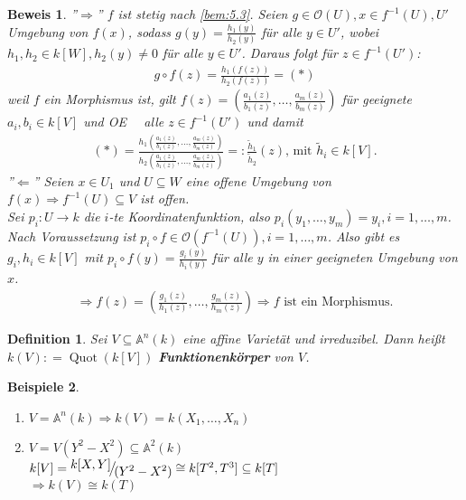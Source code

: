 \documentclass[a4paper,12pt]{report}
\theoremstyle{break}
\newtheorem{Def}{Definition}[section]
\newtheorem{Bsp}[Def]{Beispiele}
\theoremstyle{nonumberbreak}
\theoremstyle{nonumberplain}
\newtheorem{Bew}{Beweis}
\newcommand{\emp}[1]{\textbf{\emph{#1}}}
\newcommand{\begriff}[1]{{\index{#1}}\emp{#1}}
\newcommand{\defeqr}[0]{\mathrel{\mathop:}=}
\newcommand{\defeql}[0]{=\mathrel{\mathop:}}
\DeclareMathOperator{\Quot}{Quot}
\newcommand{\FakRaum}[2]{
  \raisebox{0.7ex}{\ensuremath{#1}}
  \ensuremath{\mkern-3mu}\big/\ensuremath{\mkern-3mu}
  \raisebox{-0.6ex}{\ensuremath{#2}}}
\renewcommand{\OE}{O\!\!E~}
\begin{document}
\begin{Bew}
  ''$\Rightarrow$'' $f$ ist stetig nach \ref{bem:5.3}. 
  Seien $g\in\mathcal O(U), x\in f^{-1}(U), U'$ Umgebung von $f(x)$, sodass $g(y)=\frac{h_1(y)}{h_2(y)}$ für alle $y\in U'$, wobei $h_1,h_2\in k[W], h_2(y)\neq 0$ für alle $y\in U'$. Daraus folgt für $z\in f^{-1}(U')$:
  \begin{align*}
    g\circ f(z)=\frac{h_1(f(z))}{h_2(f(z))}=(*)
  \end{align*}
  weil $f$ ein Morphismus ist, gilt $f(z)=\left(\frac{a_1(z)}{b_1(z)},\dots,\frac{a_m(z)}{b_m(z)}\right)$ für geeignete $a_i,b_i\in k[V]$ und \OE~  alle $z\in f^{-1}(U')$ und damit
  \begin{align*}
    (*)=\frac{h_1 \left( \frac{a_1(z)}{b_1(z)}, \dots, \frac{a_m(z)}{b_m(z)} \right)}{h_2 \left( \frac{a_1(z)}{b_1(z)}, \dots, \frac{a_m(z)}{b_m(z)} \right)} \defeql \frac{\tilde{h}_1}{\tilde{h}_2}(z)\text{, mit } \tilde{h}_i\in k[V].
  \end{align*}
  ''$\Leftarrow$'' Seien $x\in U_1$ und $U\subseteq W$ eine offene Umgebung von $f(x)\Rightarrow f^{-1}(U)\subseteq V$ ist offen. \\
  Sei $p_i:U\longrightarrow k$ die $i$-te Koordinatenfunktion, also $p_i(y_1,\dots,y_m)=y_i, i=1,\dots,m$. Nach Voraussetzung ist $p_i\circ f\in\mathcal O(f^{-1}(U)), i=1,\dots,m$. Also gibt es $g_i, h_i \in k[V]$ mit $p_i\circ f(y)=\frac{g_i(y)}{h_i(y)}$ für alle $y$ in einer geeigneten Umgebung von $x$.
  \begin{align*}
    \Rightarrow f(z)=\left(\frac{g_1(z)}{h_1(z)},\dots,\frac{g_m(z)}{h_m(z)}\right) \Rightarrow f \text{ ist ein Morphismus.}
  \end{align*}
\end{Bew}
\begin{Def}
  \label{def:6.10}
  Sei $V\subseteq\mathbb A^n(k)$ eine affine Varietät und irreduzibel. Dann heißt $k(V)\defeqr\Quot(k[V])$ \begriff{Funktionenkörper} von $V$.
\end{Def}
\begin{Bsp}
  \begin{enumerate}
  \item $V=\mathbb A^n(k)\Rightarrow k(V)=k(X_1,\dots,X_n)$ \\
  \item $V=V(Y^2-X^2)\subseteq\mathbb A^2(k)$ \\
    $k[V]=\FakRaum{k[X,Y]}{(Y^2-X^2)}\cong k[T^2,T^3]\subseteq k[T]$ \\
    $\Rightarrow k(V)\cong k(T)$
  \end{enumerate}
\end{Bsp}
\end{document}
